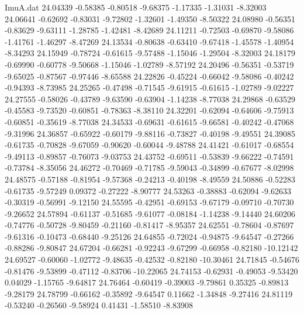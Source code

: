 \begin{filecontents}{ImuA.dat}
  24.04339   -0.58385   -0.80518   -9.68375   -1.17335   -1.31031   -8.32003
  24.06641   -0.62692   -0.83031   -9.72802   -1.32601   -1.49350   -8.50322
  24.08980   -0.56351   -0.83629   -9.63111   -1.28785   -1.42481   -8.42689
  24.11211   -0.72503   -0.69870   -9.58086   -1.41761   -1.46297   -8.47269
  24.13534   -0.80638   -0.63410   -9.67418   -1.45578   -1.40954   -8.34293
  24.15949   -0.78724   -0.61615   -9.57488   -1.15046   -1.29504   -8.32003
  24.18179   -0.69990   -0.60778   -9.50668   -1.15046   -1.02789   -8.57192
  24.20496   -0.56351   -0.53719   -9.65025   -0.87567   -0.97446   -8.65588
  24.22826   -0.45224   -0.66042   -9.58086   -0.40242   -0.94393   -8.73985
  24.25265   -0.47498   -0.71545   -9.61915   -0.61615   -1.02789   -9.02227
  24.27555   -0.58026   -0.43789   -9.63590   -0.63904   -1.14238   -8.77038
  24.29868   -0.63529   -0.45583   -9.73520   -0.60851   -0.78363   -8.38110
  24.32201   -0.62094   -0.64606   -9.75913   -0.60851   -0.35619   -8.77038
  24.34533   -0.69631   -0.61615   -9.66581   -0.40242   -0.47068   -9.31996
  24.36857   -0.65922   -0.60179   -9.88116   -0.73827   -0.40198   -9.49551
  24.39085   -0.61735   -0.70828   -9.67059   -0.90620   -0.60044   -9.48788
  24.41421   -0.61017   -0.68554   -9.49113   -0.89857   -0.76073   -9.03753
  24.43752   -0.69511   -0.53839   -9.66222   -0.74591   -0.73784   -8.35056
  24.46272   -0.70469   -0.71785   -9.59043   -0.34899   -0.67677   -8.02998
  24.48575   -0.57188   -0.81954   -9.57368   -0.24213   -0.40198   -8.49559
  24.50886   -0.52283   -0.61735   -9.57249    0.09372   -0.27222   -8.90777
  24.53263   -0.38883   -0.62094   -9.62633   -0.30319   -0.56991   -9.12150
  24.55595   -0.42951   -0.69153   -9.67179   -0.09710   -0.70730   -9.26652
  24.57894   -0.61137   -0.51685   -9.61077   -0.08184   -1.14238   -9.14440
  24.60206   -0.74776   -0.50728   -9.80459   -0.21160   -0.81417   -8.95357
  24.62551   -0.78604   -0.87697   -9.61316   -0.10473   -0.68440   -9.25126
  24.64855   -0.72024   -0.94875   -9.64547   -0.27266   -0.88286   -9.80847
  24.67204   -0.66281   -0.92243   -9.67299   -0.66958   -0.82180  -10.12142
  24.69527   -0.60060   -1.02772   -9.48635   -0.42532   -0.82180  -10.30461
  24.71845   -0.54676   -0.81476   -9.53899   -0.47112   -0.83706  -10.22065
  24.74153   -0.62931   -0.49053   -9.53420    0.04029   -1.15765   -9.64817
  24.76464   -0.60419   -0.39003   -9.79861    0.35325   -0.89813   -9.28179
  24.78799   -0.66162   -0.35892   -9.64547    0.11662   -1.34848   -9.27416
  24.81119   -0.53240   -0.26560   -9.58924    0.41431   -1.58510   -8.83908

\end{filecontents}
